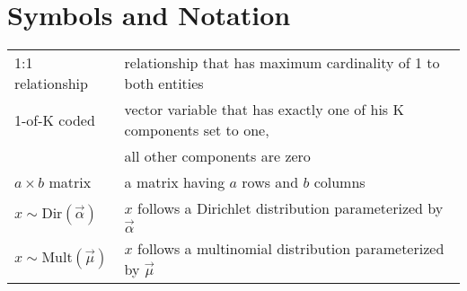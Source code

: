 \section*{Symbols and Notation}

\begin{tabular}{ll}
1:1 relationship & relationship that has maximum cardinality of 1 to both entities\\
1-of-K coded & vector variable that has exactly one of his K components set to one,\\ & all other components are zero\\
$a \times b$ matrix & a matrix having $a$ rows and $b$ columns\\
$x \sim \text{Dir}(\vec \alpha)$ & $x$ follows a Dirichlet distribution parameterized by $\vec \alpha$\\
$x \sim \text{Mult}(\vec \mu)$ & $x$ follows a multinomial distribution parameterized by $\vec \mu$
\end{tabular}
